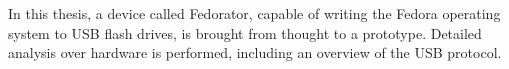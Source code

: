 In this thesis, a device called Fedorator, capable of writing the Fedora operating system to USB flash drives, is brought from thought to a prototype.  Detailed analysis over hardware is performed, including an overview of the USB protocol.

